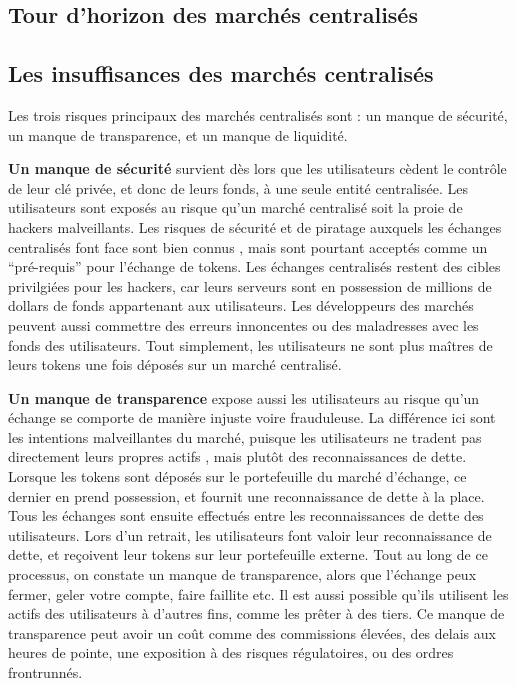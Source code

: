 \documentclass[UTF8,nofonts]{article}
\begin{document}
\begin{multicols}{2}
\section{Tour d'horizon des marchés centralisés\label{sec:current_exchange_landscape}}

\subsection{Les insuffisances des marchés centralisés}
Les trois risques principaux des marchés centralisés sont : un manque de sécurité, un manque de transparence, et un manque de liquidité.

\textbf{Un manque de sécurité} survient dès lors que les utilisateurs cèdent le contrôle de leur clé privée, et donc de leurs fonds, à une seule entité centralisée. Les utilisateurs sont exposés au risque qu'un marché centralisé soit la proie de hackers malveillants. Les risques de sécurité et de piratage auxquels les échanges centralisés font face sont bien connus \cite{coincheckhack} \cite{mcmillan2014inside}, mais sont pourtant acceptés comme un \enquote{pré-requis} pour l'échange de tokens. Les échanges centralisés restent des cibles privilgiées pour les hackers, car leurs serveurs sont en possession de millions de dollars de fonds appartenant aux utilisateurs. Les développeurs des marchés peuvent aussi commettre des erreurs innoncentes ou des maladresses avec les fonds des utilisateurs. Tout simplement, les utilisateurs ne sont plus maîtres de leurs tokens une fois déposés sur un marché centralisé.

\textbf{Un manque de transparence} expose aussi les utilisateurs au risque qu'un échange se comporte de manière injuste voire frauduleuse. La différence ici sont les intentions malveillantes du marché, puisque les utilisateurs ne tradent pas directement leurs propres actifs , mais plutôt des reconnaissances de dette. Lorsque les tokens sont déposés sur le portefeuille du marché d'échange, ce dernier en prend possession, et fournit une reconnaissance de dette à la place. Tous les échanges sont ensuite effectués entre les reconnaissances de dette des utilisateurs. Lors d'un retrait, les utilisateurs font valoir leur reconnaissance de dette, et reçoivent leur tokens sur leur portefeuille externe. Tout au long de ce processus, on constate un manque de transparence, alors que l'échange peux fermer, geler votre compte, faire faillite etc. Il est aussi possible qu'ils utilisent les actifs des utilisateurs à d'autres fins, comme les prêter à des tiers. Ce manque de transparence peut avoir un coût comme des commissions élevées, des delais aux heures de pointe, une exposition à des risques régulatoires, ou des ordres frontrunnés.


\end{multicols}
\end{document}
